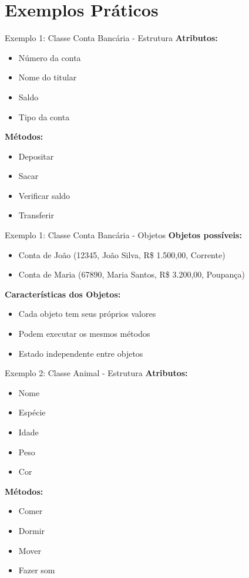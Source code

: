 \documentclass[aspectratio=169]{beamer}
\begin{document}
\section{Exemplos Práticos}

\begin{frame}{Exemplo 1: Classe Conta Bancária - Estrutura}
\textbf{Atributos:}
\begin{itemize}
\item Número da conta
\item Nome do titular
\item Saldo
\item Tipo da conta
\end{itemize}

\vspace{0.5cm}
\textbf{Métodos:}
\begin{itemize}
\item Depositar
\item Sacar
\item Verificar saldo
\item Transferir
\end{itemize}
\end{frame}

\begin{frame}{Exemplo 1: Classe Conta Bancária - Objetos}
\textbf{Objetos possíveis:}
\begin{itemize}
\item Conta de João (12345, João Silva, R\$ 1.500,00, Corrente)
\item Conta de Maria (67890, Maria Santos, R\$ 3.200,00, Poupança)
\end{itemize}

\vspace{0.5cm}
\textbf{Características dos Objetos:}
\begin{itemize}
\item Cada objeto tem seus próprios valores
\item Podem executar os mesmos métodos
\item Estado independente entre objetos
\end{itemize}
\end{frame}

\begin{frame}{Exemplo 2: Classe Animal - Estrutura}
\textbf{Atributos:}
\begin{itemize}
\item Nome
\item Espécie
\item Idade
\item Peso
\item Cor
\end{itemize}

\vspace{0.5cm}
\textbf{Métodos:}
\begin{itemize}
\item Comer
\item Dormir
\item Mover
\item Fazer som
\end{itemize}
\end{frame}
\end{document}
